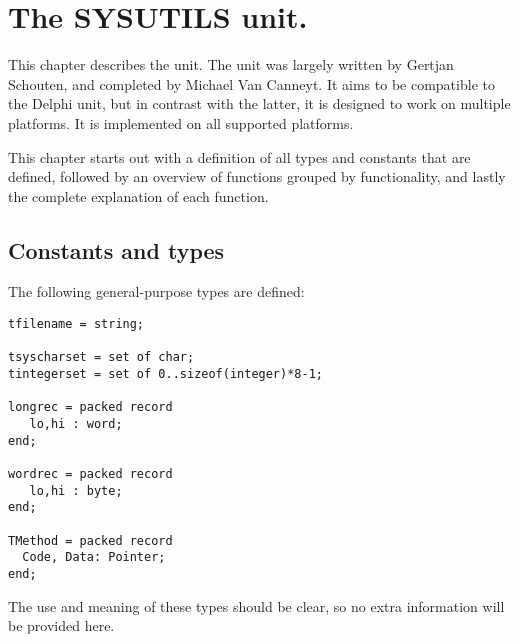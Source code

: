 %
%
%
%
%
\chapter{The SYSUTILS unit.}

This chapter describes the  unit. The  unit
was largely written by Gertjan Schouten, and completed by Michael Van Canneyt.
It aims to be compatible to the Delphi  unit, but in contrast
with  the latter, it is designed to work on multiple platforms. It is implemented
on all supported platforms.

This chapter starts out with a definition of all types and constants
that are defined, followed by an overview of functions grouped by
functionality, and lastly the complete explanation of each function.

\section{Constants and types}
The following general-purpose types are defined:
\begin{verbatim}
tfilename = string;

tsyscharset = set of char;
tintegerset = set of 0..sizeof(integer)*8-1;

longrec = packed record
   lo,hi : word;
end;

wordrec = packed record
   lo,hi : byte;
end;

TMethod = packed record
  Code, Data: Pointer;
end;
\end{verbatim}
The use and meaning of these types should be clear, so no extra information
will be provided here.

